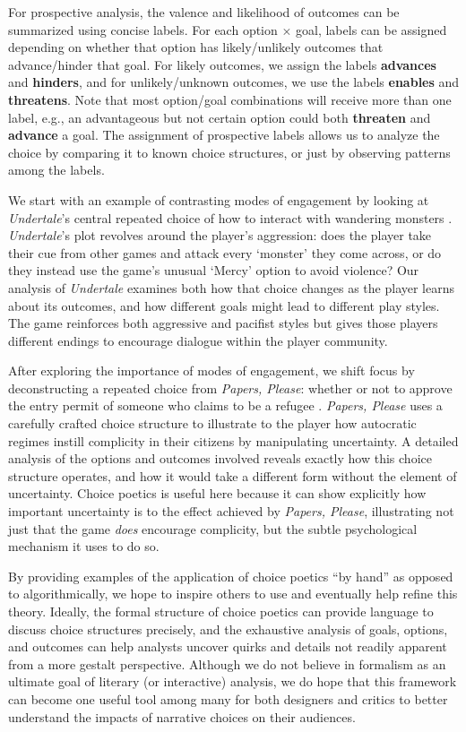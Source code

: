 \documentclass[arts,article,submit,moreauthors,pdftex,10pt,a4paper]{Definitions/mdpi}
\newcommand{\enables}{\textbf{\color{enables}enables}}
\newcommand{\advances}{\textbf{\color{advances}advances}}
\newcommand{\threatens}{\textbf{\color{threatens}threatens}}
\newcommand{\hinders}{\textbf{\color{hinders}hinders}}
\newcommand{\advancez}{\textbf{\color{advances}advance}}
\newcommand{\threatenz}{\textbf{\color{threatens}threaten}}
\begin{document}
For prospective analysis, the valence and likelihood of outcomes can be summarized using concise labels.
%
For each option $\times$ goal, labels can be assigned depending on whether that option has likely/unlikely outcomes that advance/hinder that goal.
%
For likely outcomes, we assign the labels \advances{} and \hinders{}, and for unlikely/unknown outcomes, we use the labels \enables{} and \threatens{}.
%
Note that most option/goal combinations will receive more than one label, e.g., an advantageous but not certain option could both \threatenz{} and \advancez{} a goal.
%
The assignment of prospective labels allows us to analyze the choice by comparing it to known choice structures, or just by observing patterns among the labels.


We start with an example of contrasting modes of engagement by looking at \emph{Undertale}'s central repeated choice of how to interact with wandering monsters \citep{fox2015undertale}.
%
\emph{Undertale}'s plot revolves around the player's aggression: does the player take their cue from other games and attack every `monster' they come across, or do they instead use the game's unusual `Mercy' option to avoid violence?
%
Our analysis of \emph{Undertale} examines both how that choice changes as the player learns about its outcomes, and how different goals might lead to different play styles.
%
The game reinforces both aggressive and pacifist styles but gives those players different endings to encourage dialogue within the player community.


After exploring the importance of modes of engagement, we shift focus by deconstructing a repeated choice from \emph{Papers, Please}: whether or not to approve the entry permit of someone who claims to be a refugee \citep{pope2013papers}.
%
\emph{Papers, Please} uses a carefully crafted choice structure to illustrate to the player how autocratic regimes instill complicity in their citizens by manipulating uncertainty.
%
A detailed analysis of the options and outcomes involved reveals exactly how this choice structure operates, and how it would take a different form without the element of uncertainty.
%
Choice poetics is useful here because it can show explicitly how important uncertainty is to the effect achieved by \emph{Papers, Please}, illustrating not just that the game \emph{does} encourage complicity, but the subtle psychological mechanism it uses to do so.


By providing examples of the application of choice poetics ``by hand'' as opposed to algorithmically, we hope to inspire others to use and eventually help refine this theory.
%
Ideally, the formal structure of choice poetics can provide language to discuss choice structures precisely, and the exhaustive analysis of goals, options, and outcomes can help analysts uncover quirks and details not readily apparent from a more gestalt perspective.
%
Although we do not believe in formalism as an ultimate goal of literary (or interactive) analysis, we do hope that this framework can become one useful tool among many for both designers and critics to better understand the impacts of narrative choices on their audiences.
\end{document}
